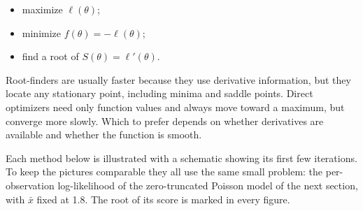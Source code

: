 \documentclass[
  letterpaper,
  DIV=11,
  numbers=noendperiod]{scrreprt}
\providecommand{\tightlist}{%
  \setlength{\itemsep}{0pt}\setlength{\parskip}{0pt}}
\begin{document}
\begin{itemize}
\tightlist
\item
  maximize \(\ell(\theta)\);
\item
  minimize \(f(\theta) = -\ell(\theta)\);
\item
  find a root of \(S(\theta) = \ell'(\theta)\).
\end{itemize}

Root-finders are usually faster because they use derivative information,
but they locate any stationary point, including minima and saddle
points. Direct optimizers need only function values and always move
toward a maximum, but converge more slowly. Which to prefer depends on
whether derivatives are available and whether the function is smooth.

Each method below is illustrated with a schematic showing its first few
iterations. To keep the pictures comparable they all use the same small
problem: the per-observation log-likelihood of the zero-truncated
Poisson model of the next section, with \(\bar x\) fixed at 1.8. The
root of its score is marked in every figure.
\end{document}
